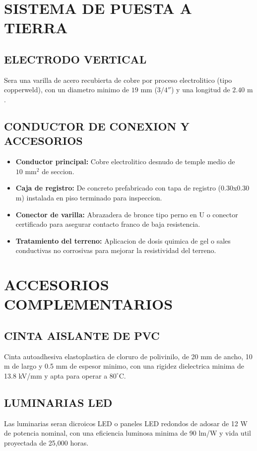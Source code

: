 \section{SISTEMA DE PUESTA A TIERRA}

\subsection{ELECTRODO VERTICAL}
Sera una varilla de acero recubierta de cobre por proceso electrolitico (tipo copperweld), con un diametro minimo de \(19\text{ mm}\) (\(3/4''\)) y una longitud de \(2.40\text{ m}\).

\subsection{CONDUCTOR DE CONEXION Y ACCESORIOS}
\begin{itemize}
  \item \textbf{Conductor principal:} Cobre electrolitico desnudo de temple medio de \(10\text{ mm}^2\) de seccion.
  \item \textbf{Caja de registro:} De concreto prefabricado con tapa de registro (0.30x0.30 m) instalada en piso terminado para inspeccion.
  \item \textbf{Conector de varilla:} Abrazadera de bronce tipo perno en U o conector certificado para asegurar contacto franco de baja resistencia.
  \item \textbf{Tratamiento del terreno:} Aplicacion de dosis quimica de gel o sales conductivas no corrosivas para mejorar la resistividad del terreno.
\end{itemize}

\section{ACCESORIOS COMPLEMENTARIOS}

\subsection{CINTA AISLANTE DE PVC}
Cinta autoadhesiva elastoplastica de cloruro de polivinilo, de 20 mm de ancho, 10 m de largo y 0.5 mm de espesor minimo, con una rigidez dielectrica minima de 13.8 kV/mm y apta para operar a \(80^\circ\text{C}\).

\subsection{LUMINARIAS LED}
Las luminarias seran dicroicos LED o paneles LED redondos de adosar de 12 W de potencia nominal, con una eficiencia luminosa minima de 90 lm/W y vida util proyectada de 25,000 horas.
\fi
